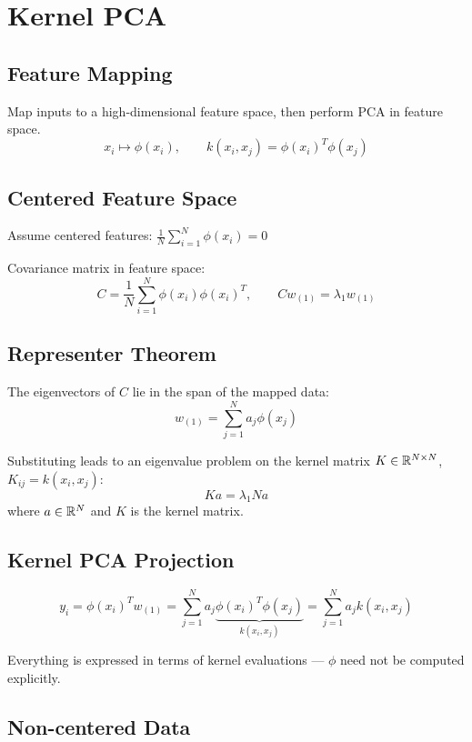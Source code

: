 \documentclass[11pt,a4paper,openany]{book}
\begin{document}
\section{Kernel PCA}

\subsection{Feature Mapping}

Map inputs to a high-dimensional feature space, then perform PCA in feature space.
\[
x_i \mapsto \phi(x_i), \qquad k(x_i,x_j) = \phi(x_i)^T \phi(x_j)
\]

\subsection{Centered Feature Space}

Assume centered features: \(\displaystyle\frac{1}{N}\sum_{i=1}^{N}\phi(x_i) = 0\)

Covariance matrix in feature space:
\[
C = \frac{1}{N}\sum_{i=1}^{N}\phi(x_i)\phi(x_i)^T,
\qquad Cw_{(1)} = \lambda_1 w_{(1)}
\]

\subsection{Representer Theorem}

\begin{propbox}[title=Representer Theorem]
The eigenvectors of \(C\) lie in the span of the mapped data:
\[
w_{(1)} = \sum_{j=1}^{N} a_j \phi(x_j)
\]

Substituting leads to an eigenvalue problem on the kernel matrix \(K \in \mathbb{R}^{N \times N}\), \(K_{ij} = k(x_i,x_j)\):
\[
Ka = \lambda_1 N a
\]
where \(a \in \mathbb{R}^N\) and \(K\) is the kernel matrix.
\end{propbox}

\subsection{Kernel PCA Projection}

\[
y_i
= \phi(x_i)^T w_{(1)}
= \sum_{j=1}^{N} a_j \underbrace{\phi(x_i)^T \phi(x_j)}_{k(x_i,x_j)}
= \sum_{j=1}^{N} a_j k(x_i,x_j)
\]

Everything is expressed in terms of kernel evaluations — \(\phi\) need not be computed explicitly.

\subsection{Non-centered Data}
\end{document}
